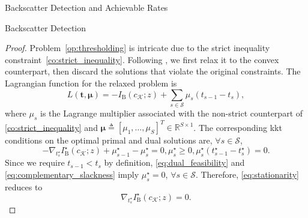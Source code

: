 \documentclass[journal]{IEEEtran}
\begin{document}
\begin{section}{Backscatter Detection and Achievable Rates}
\begin{subsection}{Backscatter Detection}
\begin{proof}
				Problem~\eqref{op:thresholding} is intricate due to the strict inequality constraint~\eqref{co:strict_inequality}. Following \cite{Nguyen2020}, we first relax it to the convex counterpart, then discard the solutions that violate the original constraints. The Lagrangian function for the relaxed problem is
				\begin{equation}
					L(\boldsymbol{t},\boldsymbol{\mu}) = - I_{\mathrm{B}}(c_{\mathcal{K}};z) + \sum_{s \in \mathcal{S}} \mu_s (t_{s-1} - t_s),
				\end{equation}
				where $\mu_s$ is the Lagrange multiplier associated with the non-strict counterpart of \eqref{co:strict_inequality} and $\boldsymbol{\mu} \triangleq [\mu_1,\ldots,\mu_S]^T \in \mathbb{R}^{S \times 1}$. The corresponding \gls{kkt} conditions on the optimal primal and dual solutions are, $\forall s \in \mathcal{S}$,
				\begin{subequations}
					\begin{equation}
						- \nabla_{t_s^{\star}} I^{\star}_{\mathrm{B}}(c_{\mathcal{K}};z) + \mu_{s-1}^{\star} - \mu_s^{\star} = 0,
						\label{eq:stationarity}
					\end{equation}
					\begin{equation}
						\mu_s^{\star} \ge 0,
						\label{eq:dual_feasibility}
					\end{equation}
					\begin{equation}
						\mu_s^{\star} (t_{s-1}^{\star} - t_s^{\star}) = 0.
						\label{eq:complementary_slackness}
					\end{equation}
				\end{subequations}
				Since we require $t_{s-1} < t_s$ by definition, \eqref{eq:dual_feasibility} and \eqref{eq:complementary_slackness} imply $\mu_s^{\star} = 0$, $\forall s \in \mathcal{S}$. Therefore, \eqref{eq:stationarity} reduces to
				\begin{equation}
					\nabla_{t_s^{\star}} I^{\star}_{\mathrm{B}}(c_{\mathcal{K}};z) = 0.
				\end{equation}
			\end{proof}




\end{subsection}
\end{section}
\end{document}
